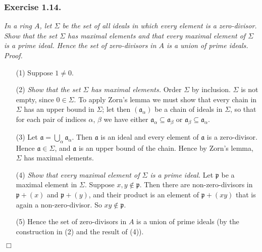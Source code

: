 \documentclass{article}
\begin{document}



\subsubsection*{Exercise 1.14.}
\emph{In a ring $A$, let $\Sigma$ be the set of all ideals in which every element is a zero-divisor.
Show that the set $\Sigma$ has maximal elements and
that every maximal element of $\Sigma$ is a prime ideal.
Hence the set of zero-divisors in $A$ is a union of prime ideals.} \\



\emph{Proof.}
\begin{enumerate}
\item[(1)]
  Suppose $1 \neq 0$.

\item[(2)]
  \emph{Show that the set $\Sigma$ has maximal elements.}
  Order $\Sigma$ by inclusion.
  $\Sigma$ is not empty, since $0 \in \Sigma$.
  To apply Zorn's lemma we must show that every chain in $\Sigma$ has an upper bound in $\Sigma$;
  let then $(\mathfrak{a}_\alpha)$ be a chain of ideals in $\Sigma$,
  so that for each pair of indices $\alpha$, $\beta$ we have either
  $\mathfrak{a}_\alpha \subseteq \mathfrak{a}_\beta$ or
  $\mathfrak{a}_\beta \subseteq \mathfrak{a}_\alpha$.

\item[(3)]
  Let $\mathfrak{a} = \bigcup_{\alpha} \mathfrak{a}_\alpha$.
  Then $\mathfrak{a}$ is an ideal and every element of $\mathfrak{a}$ is a zero-divisor.
  Hence $\mathfrak{a} \in \Sigma$, and $\mathfrak{a}$ is an upper bound of the chain.
  Hence by Zorn's lemma, $\Sigma$ has maximal elements.

\item[(4)]
  \emph{Show that every maximal element of $\Sigma$ is a prime ideal.}
  Let $\mathfrak{p}$ be a maximal element in $\Sigma$.
  Suppose $x, y \not\in \mathfrak{p}$.
  Then there are non-zero-divisors in $\mathfrak{p} + (x)$ and $\mathfrak{p} + (y)$,
  and their product is an element of $\mathfrak{p} + (xy)$ that is again a non-zero-divisor.
  So $xy \not\in \mathfrak{p}$.

\item[(5)]
  Hence the set of zero-divisors in $A$ is a union of prime ideals
  (by the construction in (2) and the result of (4)).
\end{enumerate}
$\Box$ \\\\
\end{document}
